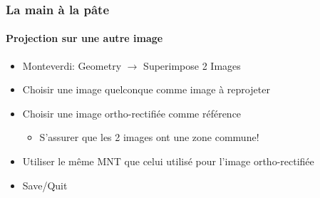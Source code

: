 \documentclass[compress]{beamer}
\begin{document}
\begin{frame}
  \frametitle{La main à la pâte}
  \framesubtitle{Projection sur une autre image}
  \begin{itemize}
  \item Monteverdi: Geometry $\rightarrow$ Superimpose 2 Images
  \item Choisir une image quelconque comme image à reprojeter
  \item Choisir une image ortho-rectifiée comme référence
    \begin{itemize}
    \item S'assurer que les 2 images ont une zone commune!
    \end{itemize}
  \item Utiliser le même MNT que celui utilisé pour l'image ortho-rectifiée
  \item Save/Quit
  \end{itemize}
\end{frame}
\end{document}
